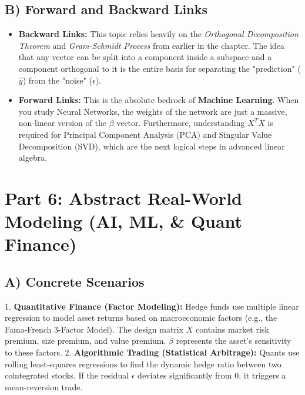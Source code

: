 \documentclass[11pt, letterpaper]{article}
\theoremstyle{definition}
\theoremstyle{remark}
\begin{document}
\subsection{B) Forward and Backward Links}
\begin{itemize}
    \item \textbf{Backward Links:} This topic relies heavily on the \textit{Orthogonal Decomposition Theorem} and \textit{Gram-Schmidt Process} from earlier in the chapter. The idea that any vector can be split into a component inside a subspace and a component orthogonal to it is the entire basis for separating the "prediction" ($\hat{y}$) from the "noise" ($\epsilon$).
    \item \textbf{Forward Links:} This is the absolute bedrock of \textbf{Machine Learning}. When you study Neural Networks, the weights of the network are just a massive, non-linear version of the $\beta$ vector. Furthermore, understanding $X^T X$ is required for Principal Component Analysis (PCA) and Singular Value Decomposition (SVD), which are the next logical steps in advanced linear algebra.
\end{itemize}

\section{Part 6: Abstract Real-World Modeling (AI, ML, \& Quant Finance)}

\subsection{A) Concrete Scenarios}
1. \textbf{Quantitative Finance (Factor Modeling):} Hedge funds use multiple linear regression to model asset returns based on macroeconomic factors (e.g., the Fama-French 3-Factor Model). The design matrix $X$ contains market risk premium, size premium, and value premium. $\beta$ represents the asset's sensitivity to these factors.
2. \textbf{Algorithmic Trading (Statistical Arbitrage):} Quants use rolling least-squares regressions to find the dynamic hedge ratio between two cointegrated stocks. If the residual $\epsilon$ deviates significantly from 0, it triggers a mean-reversion trade.
\end{document}
